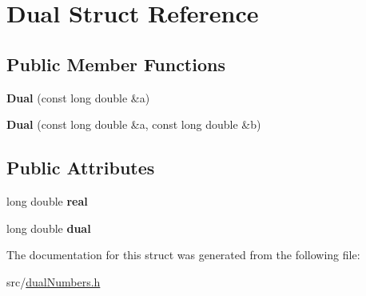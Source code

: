 \hypertarget{struct_dual}{}\section{Dual Struct Reference}
\label{struct_dual}
\subsection*{Public Member Functions}
\begin{DoxyCompactItemize}
\item 
\mbox{\label{struct_dual_acc8f41a481e4b8a60a8d77b64b628b87}} 
{\bfseries Dual} (const long double \&a)
\item 
\mbox{\label{struct_dual_a2bb3790feb482c6c2ac871ef1242e6ac}} 
{\bfseries Dual} (const long double \&a, const long double \&b)
\end{DoxyCompactItemize}
\subsection*{Public Attributes}
\begin{DoxyCompactItemize}
\item 
\mbox{\label{struct_dual_a5a1ea33da03904de93907af29cdaa273}} 
long double {\bfseries real}
\item 
\mbox{\label{struct_dual_afb4884cac1516701930c82a66674ef9e}} 
long double {\bfseries dual}
\end{DoxyCompactItemize}


The documentation for this struct was generated from the following file\+:\begin{DoxyCompactItemize}
\item 
src/\mbox{\hyperlink{dual_numbers_8h}{dual\+Numbers.\+h}}\end{DoxyCompactItemize}
